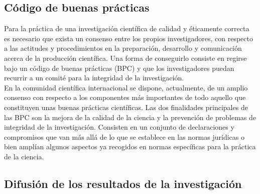 \subsection{Código de buenas prácticas}
Para la práctica de una investigación científica de calidad y éticamente correcta es necesario que exista un consenso entre los propios 
investigadores, con respecto a las actitudes y procedimientos en la preparación, desarrollo y comunicación acerca de la producción 
científica. Una forma de conseguirlo consiste en regirse bajo un código de buenas prácticas (BPC) y que los investigadores puedan
recurrir a un comité para la integridad de la investigación.\\
En la comunidad científica internacional se dispone, actualmente, de un amplio consenso
con respecto a los componentes más importantes de todo aquello que constituyen unas
buenas prácticas científicas. Las dos finalidades principales de las BPC son la mejora
de la calidad de la ciencia y la prevención de problemas de integridad de la investigación.
Consisten en un conjunto de declaraciones y compromisos que van más allá de lo que se
establece en las normas jurídicas o bien amplían algunos aspectos ya recogidos en normas
específicas para la práctica de la ciencia.
\subsection{Difusión de los resultados de la investigación}
